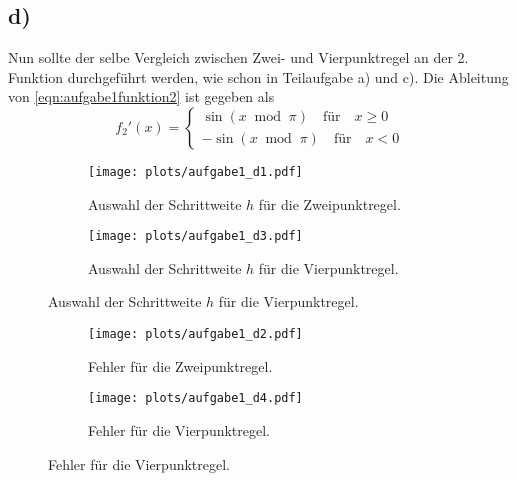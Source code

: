   \subsection{d)}
    Nun sollte der selbe Vergleich zwischen Zwei- und Vierpunktregel an der 2. Funktion durchgeführt werden, wie schon in Teilaufgabe a) und c).
    Die Ableitung von \ref{eqn:aufgabe1funktion2} ist gegeben als
    \begin{equation}
      f_2'(x) = \left\{
        \begin{matrix}
          \sin(x \;\;\text{mod}\;\; \pi) \quad \text{für} \quad x \geq 0 \\[2pt]
          -\sin(x \;\;\text{mod}\;\; \pi) \quad \text{für} \quad x < 0
        \end{matrix}
      \right.
    \end{equation}
    
    \begin{figure}[ht]
      \centering
      \begin{subfigure}{0.49\textwidth}
          \texttt{[image: plots/aufgabe1\_d1.pdf]} \vspace*{-0.6cm}
          \caption{Auswahl der Schrittweite $h$ für die Zweipunktregel.}
          \label{fig:aufgabe1_d1}
      \end{subfigure}
      \hfill
      \begin{subfigure}{0.49\textwidth}
          \texttt{[image: plots/aufgabe1\_d3.pdf]} \vspace*{-0.6cm}
          \caption{Auswahl der Schrittweite $h$ für die Vierpunktregel.}
          \label{fig:aufgabe1_d3}
      \end{subfigure}
      
  \end{figure}
  
  \FloatBarrier

  \begin{figure}[ht]
    \centering
    \begin{subfigure}{0.49\textwidth}
        \texttt{[image: plots/aufgabe1\_d2.pdf]} \vspace*{-0.6cm}
        \caption{Fehler für die Zweipunktregel.}
        \label{fig:aufgabe1_d2}
    \end{subfigure}
    \hfill
    \begin{subfigure}{0.49\textwidth}
        \texttt{[image: plots/aufgabe1\_d4.pdf]} \vspace*{-0.6cm}
        \caption{Fehler für die Vierpunktregel.}
        \label{fig:aufgabe1_d4}
    \end{subfigure}
    
  \end{figure}

\FloatBarrier